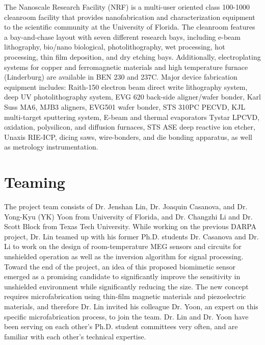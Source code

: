The Nanoscale Research Facility (NRF) is a multi-user oriented class 100-1000 cleanroom facility that provides nanofabrication and characterization equipment to the scientific community at the University of Florida. The cleanroom features a bay-and-chase layout with seven different research bays, including e-beam lithography, bio/nano biological, photolithography, wet processing, hot processing, thin film deposition, and dry etching bays.  Additionally, electroplating systems for copper and ferromagnetic materials and high temperature furnace (Linderburg) are available in BEN 230 and 237C. Major device fabrication equipment includes: Raith-150 electron beam direct write lithography system, deep UV photolithography system, EVG 620 back-side aligner/wafer bonder, Karl Suss MA6, MJB3 aligners, EVG501 wafer bonder, STS 310PC PECVD, KJL multi-target sputtering system, E-beam and thermal evaporators Tystar LPCVD, oxidation, polysilicon, and diffusion furnaces, STS ASE deep reactive ion etcher, Unaxis RIE-ICP, dicing saws, wire-bonders, and die bonding apparatus, as well as metrology instrumentation.

\section{Teaming}
The project team consists of Dr. Jenshan Lin, Dr. Joaquin Casanova, and Dr. Yong-Kyu (YK) Yoon from University of Florida, and Dr. Changzhi Li and Dr. Scott Block from Texas Tech University. While working on the previous DARPA project, Dr. Lin teamed up with his former Ph.D. students Dr. Casanova and Dr. Li to work on the design of room-temperature MEG sensors and circuits for unshielded operation as well as the inversion algorithm for signal processing. Toward the end of the project, an idea of this proposed biomimetic sensor emerged as a promising candidate to significantly improve the sensitivity in unshielded environment while significantly reducing the size. The new concept requires microfabrication using thin-film magnetic materials and piezoelectric materials, and therefore Dr. Lin invited his colleague Dr. Yoon, an expert on this specific microfabrication process, to join the team. Dr. Lin and Dr. Yoon have been serving on each other’s Ph.D. student committees very often, and are familiar with each other’s technical expertise.

